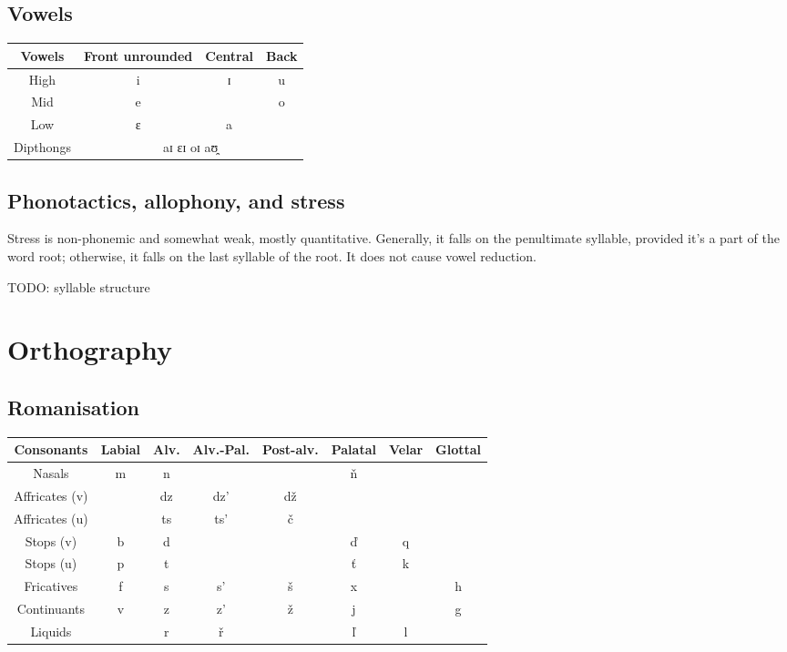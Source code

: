 \documentclass[12pt]{article}
\begin{document}
	\subsection{Vowels}

	\begin{tabular}{|| c | c c c || }
		\hline
		Vowels & Front unrounded & Central & Back \\
		\hline
		High & i & ɪ & u \\
		Mid & e &  & o \\
		Low & ɛ & a & \\
		Dipthongs & \multicolumn{3}{c||}{aɪ ɛɪ oɪ aʊ̯} \\
		\hline
	\end{tabular}

	\subsection{Phonotactics, allophony, and stress}

	Stress is non-phonemic and somewhat weak, mostly quantitative. Generally, it falls on the penultimate syllable, provided it's a part of the word root; otherwise, it falls on the last syllable of the root. It does not cause vowel reduction.

	TODO: syllable structure

	\section{Orthography}
	
	\subsection{Romanisation} 

	\begin{tabular}{||c | c c c c c c c ||}
		\hline
		Consonants & Labial & Alv. & Alv.-Pal. &
		Post-alv. & Palatal & Velar & Glottal \\
		\hline
		Nasals & m & n & & & ň & & \\
		Affricates (v) & & dz &  dz' & dž & & & \\
		Affricates (u) & & ts & ts' & č & & & \\
		Stops (v) & b & d & & & ď & q & \\
		Stops (u) & p & t & & & ť & k & \\
		Fricatives & f & s & s' & š & x & & h \\
		Continuants & v & z & z' & ž & j & & g \\
		Liquids & & r & ř & & ľ & l & \\
		\hline
	\end{tabular}
\end{document}
